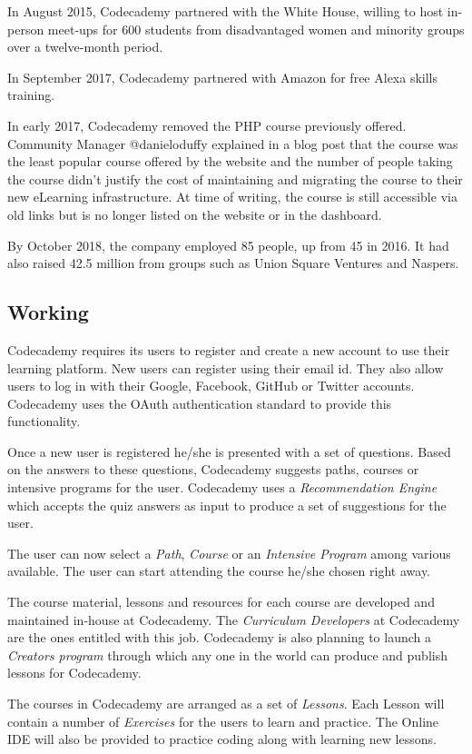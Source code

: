 In August 2015, Codecademy partnered with the White House, willing to host in-person meet-ups for 600 students from disadvantaged women and minority groups over a twelve-month period.

In September 2017, Codecademy partnered with Amazon for free Alexa skills training.

In early 2017, Codecademy removed the PHP course previously offered. Community Manager @danieloduffy explained in a blog post that the course was the least popular course offered by the website and the number of people taking the course didn't justify the cost of maintaining and migrating the course to their new eLearning infrastructure. At time of writing, the course is still accessible via old links but is no longer listed on the website or in the dashboard.

By October 2018, the company employed 85 people, up from 45 in 2016. It had also raised 42.5 million from groups such as Union Square Ventures and Naspers.


\subsection{Working}
Codecademy requires its users to register and create a new account to use their learning platform. New users can register using their email id. They also allow users to log in with their Google, Facebook, GitHub or Twitter accounts. Codecademy uses the OAuth authentication standard to provide this functionality.

Once a new user is registered he/she is presented with a set of questions. Based on the answers to these questions, Codecademy suggests paths, courses or intensive programs for the user. Codecademy uses a {\em Recommendation Engine} which accepts the quiz answers as input to produce a set of suggestions for the user.

The user can now select a {\em Path}, {\em Course} or an {\em Intensive Program} among various available. The user can start attending the course he/she chosen right away.

The course material, lessons and resources for each course are developed and maintained in-house at Codecademy. The {\em Curriculum Developers} at Codecademy are the ones entitled with this job. Codecademy is also planning to launch a {\em Creators program} through which any one in the world can produce and publish lessons for Codecademy.

The courses in Codecademy are arranged as a set of {\em Lessons}. Each Lesson will contain a number of {\em Exercises} for the users to learn and practice. The Online IDE will also be provided to practice coding along with learning new lessons.

